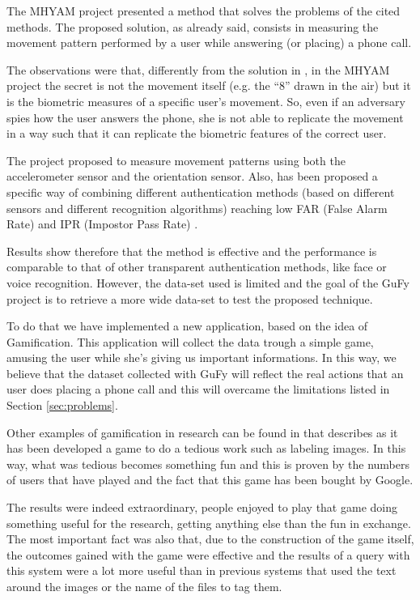 The MHYAM project \cite{MHYAM} presented a method that solves the problems of the cited methods. The proposed solution, as already said, consists in measuring the movement pattern performed by a user while answering (or placing) a phone call. 

The observations were that, differently from the solution in \cite{accelerometer}, in the MHYAM project the secret is not the movement itself (e.g. the ``8'' drawn in the air) but it is the biometric measures of a specific user's movement. So, even if an adversary spies how the user answers the phone, she is not able to replicate the movement in a way such that it can replicate the biometric features of the correct user.

The project proposed to measure movement patterns using both the accelerometer sensor and the orientation sensor. Also, has been proposed a specific way of combining different authentication methods (based on different sensors and different recognition algorithms) reaching low FAR (False Alarm Rate) and IPR (Impostor Pass Rate) \cite{multimodalBiometrics}.

Results show therefore that the method is effective and the performance is comparable to that of other transparent authentication methods, like face or voice recognition. However, the data-set used is limited and the goal of the GuFy project is to retrieve a more wide data-set to test the proposed technique. 

To do that we have implemented a new application, based on the idea of Gamification. This application will collect the data trough a simple game, amusing the user while she's giving us important informations. In this way, we believe that the dataset collected with GuFy will reflect the real actions that an user does placing a phone call and this will overcame the limitations listed in Section \ref{sec:problems}. 

Other examples of gamification in research can be found in \cite{vonAhn:2004:LIC:985692.985733} that describes as it has been developed a game to do a tedious work such as labeling images. In this way, what was tedious becomes something fun and this is proven by the numbers of users that have played and the fact that this game has been bought by Google.

The results were indeed extraordinary, people enjoyed to play that game doing something useful for the research, getting anything else than the fun in exchange. The most important fact was also that, due to the construction of the game itself, the outcomes gained with the game were effective and the results of a query with this system were a lot more useful than in previous systems that used the text around the images or the name of the files to tag them.


